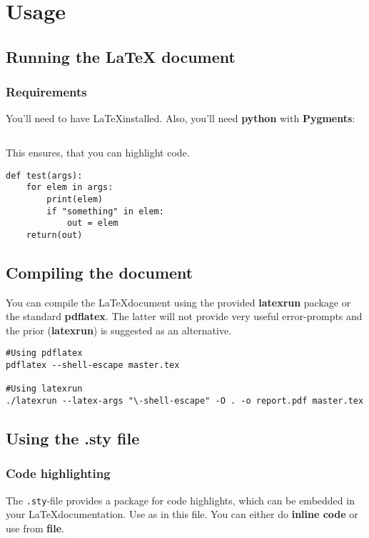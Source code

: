 \section{Usage}

\subsection{Running the LaTeX document}

\subsubsection{Requirements}

You'll need to have \LaTeX  installed. Also, you'll need \textbf{python} with \textbf{Pygments}:

\inputminted{python}{src/installPygments.py}

This ensures, that you can highlight code.
\begin{verbatim}
def test(args):
	for elem in args:
		print(elem)
		if "something" in elem:
			out = elem
	return(out)
\end{verbatim}

\subsection{Compiling the document}

You can compile the \LaTeX  document using the provided \textbf{latexrun} package or the standard \textbf{pdflatex}. The latter will not provide very useful error-prompts and the prior (\textbf{latexrun}) is suggested as an alternative. 

\begin{verbatim}
#Using pdflatex
pdflatex --shell-escape master.tex

#Using latexrun
./latexrun --latex-args "\-shell-escape" -O . -o report.pdf master.tex
\end{verbatim}

\subsection{Using the .sty file}

\subsubsection{Code highlighting}
The \texttt{.sty}-file provides a package for code highlights, which can be embedded in your \LaTeX  documentation. Use as in this file. You can either do \textbf{inline code} or use from \textbf{file}. 


